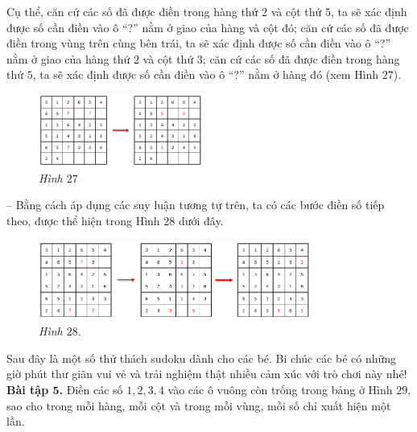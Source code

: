 	Cụ thể, căn cứ các số đã được điền trong hàng thứ $2$ và cột thứ $5$, ta sẽ xác định được số cần điền vào ô “?” nằm ở giao của hàng và cột đó; căn cứ các số đã được điền trong vùng trên cùng  bên trái, ta sẽ xác định được số cần điền vào ô “?” nằm ở giao của hàng thứ $2$ và cột thứ $3$; căn cứ các số đã được điền trong hàng thứ $5$, ta sẽ xác định được số cần điền vào ô “?” nằm ở hàng đó (xem Hình $27$).
	\begin{figure}[H]
		\centering
		\vspace*{-10pt}
		\captionsetup{labelformat= empty, justification=centering}
		\includegraphics[width=0.48\textwidth]{pic16}
		\vspace*{-5pt}
		\caption{\small\textit{Hình $27$}}
		\vspace*{-10pt}
	\end{figure}
	-- Bằng cách áp dụng các suy luận tương tự trên, ta có các bước điền số tiếp theo, được thể hiện trong Hình $28$ dưới đây.
	\begin{figure}[H]
		\centering
		\vspace*{-10pt}
		\captionsetup{labelformat= empty, justification=centering}
		\includegraphics[width=0.8\textwidth]{pic17}
		\vspace*{-5pt}
		\caption{\small\textit{Hình $28.$}}
		\vspace*{-5pt}
	\end{figure}
	Sau đây là một số thử thách sudoku dành cho các bé. Bi chúc các bé có những giờ phút thư giãn vui vẻ và trải nghiệm thật nhiều cảm xúc với trò chơi này nhé!
	\vskip 0.15cm
	\textbf{\color{toancuabi}Bài tập $\pmb{5}$.} Điền các số $1, 2, 3, 4$ vào các ô vuông còn trống trong bảng ở Hình $29$, sao cho trong mỗi hàng, mỗi cột và trong mỗi vùng, mỗi số chỉ xuất hiện một lần.
